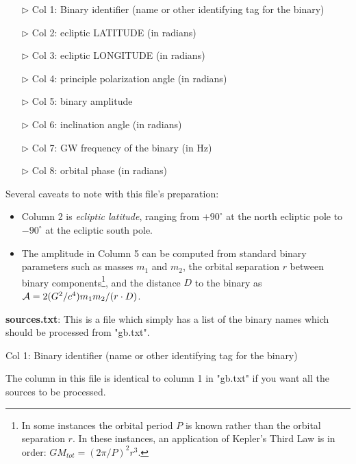\documentclass[11pt]{report}
\begin{document}
\begin{itemize}
   \item[$\triangleright$] Col 1: Binary identifier (name or other
   identifying tag for the binary)
   
   \item[$\triangleright$] Col 2: ecliptic LATITUDE (in radians)
   
   \item[$\triangleright$] Col 3: ecliptic LONGITUDE (in radians)
   
   \item[$\triangleright$] Col 4: principle polarization angle (in radians)
   
   \item[$\triangleright$] Col 5: binary amplitude
   
   \item[$\triangleright$] Col 6: inclination angle (in radians)
   
   \item[$\triangleright$] Col 7: GW frequency of the binary (in Hz)
   
   \item[$\triangleright$] Col 8: orbital phase (in radians)
\end{itemize}
Several caveats to note with this file's preparation:
\begin{itemize}
   \item Column 2 is \emph{ecliptic latitude}, ranging from
   $+90^{\circ}$ at the north ecliptic pole to $-90^{\circ}$ at the
   ecliptic south pole.

   \item The amplitude in Column 5 can be computed from standard binary
   parameters such as masses $m_{1}$ and $m_{2}$, the orbital
   separation $r$ between binary components\footnote{In some instances 
   the orbital period $P$ is known rather than the orbital separation 
   $r$.  In these instances, an application of Kepler's Third Law is
   in order: $G M_{tot} = (2 \pi/P)^{2} r^{3}$.}, and the distance $D$
   to the binary as ${\cal A} = 2 (G^{2}/c^{4}) m_{1}m_{2}/(r\cdot D)$.
\end{itemize}

{\bf sources.txt}: This is a file which simply has a list of the binary
names which should be processed from "gb.txt".

Col 1: Binary identifier (name or other identifying tag for the binary)

The column in this file is identical to column 1 in "gb.txt" if you
want all the sources to be processed.
\end{document}

